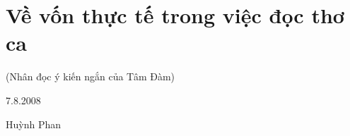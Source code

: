 \documentclass[../main.tex]{subfiles}
\begin{document}
\chapter{Về vốn thực tế trong việc đọc thơ ca}

\begin{subtitle}

(Nhân đọc ý kiến ngắn của Tâm Đàm)

\end{subtitle}

\begin{metadata}

\begin{flushright}7.8.2008\end{flushright}

Huỳnh Phan



\end{metadata}
\end{document}
